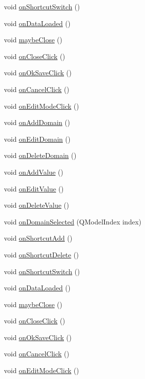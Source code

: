 \begin{DoxyCompactItemize}
\item 
void \hyperlink{class_domain_wnd_a923587b6e769548b01f6f301c70a75c5}{onShortcutSwitch} ()
\item 
void \hyperlink{class_domain_wnd_a97da398953d83b30ff9d510775f2429c}{onDataLoaded} ()
\item 
void \hyperlink{class_domain_wnd_a368d9485107021c0e17bde999533287a}{maybeClose} ()
\item 
void \hyperlink{class_domain_wnd_a87a607a1237bca2a8f6dbbe86cd02c99}{onCloseClick} ()
\item 
void \hyperlink{class_domain_wnd_a43db3327059f15b49495f0339c3e1a19}{onOkSaveClick} ()
\item 
void \hyperlink{class_domain_wnd_ab97def7e850e13d36679ef1f00dd78b0}{onCancelClick} ()
\item 
void \hyperlink{class_domain_wnd_a57deeaf7efeb50e45615cd6f3d1d9625}{onEditModeClick} ()
\item 
void \hyperlink{class_domain_wnd_a3aa016423aaec2a32099969faf1322cd}{onAddDomain} ()
\item 
void \hyperlink{class_domain_wnd_aafb419e408567c2725302f7c0f696a25}{onEditDomain} ()
\item 
void \hyperlink{class_domain_wnd_aa20577445a46b501095d8972a8999901}{onDeleteDomain} ()
\item 
void \hyperlink{class_domain_wnd_ac589d9fd81ef4ea8420850a975b81f6a}{onAddValue} ()
\item 
void \hyperlink{class_domain_wnd_aef95efd55420445d8b160d27e6967e42}{onEditValue} ()
\item 
void \hyperlink{class_domain_wnd_a315941c78082d8a44a670bcb55de972f}{onDeleteValue} ()
\item 
void \hyperlink{class_domain_wnd_a91c13e562f3f80ae1f8177a83d2e5f27}{onDomainSelected} (QModelIndex index)
\item 
void \hyperlink{class_domain_wnd_a4d8381ab52c1196d34565d58536f23f0}{onShortcutAdd} ()
\item 
void \hyperlink{class_domain_wnd_a9ca370e771d751c4c633b6a9fe800efb}{onShortcutDelete} ()
\item 
void \hyperlink{class_domain_wnd_a923587b6e769548b01f6f301c70a75c5}{onShortcutSwitch} ()
\item 
void \hyperlink{class_domain_wnd_a97da398953d83b30ff9d510775f2429c}{onDataLoaded} ()
\item 
void \hyperlink{class_domain_wnd_a368d9485107021c0e17bde999533287a}{maybeClose} ()
\item 
void \hyperlink{class_domain_wnd_a87a607a1237bca2a8f6dbbe86cd02c99}{onCloseClick} ()
\item 
void \hyperlink{class_domain_wnd_a43db3327059f15b49495f0339c3e1a19}{onOkSaveClick} ()
\item 
void \hyperlink{class_domain_wnd_ab97def7e850e13d36679ef1f00dd78b0}{onCancelClick} ()
\item 
void \hyperlink{class_domain_wnd_a57deeaf7efeb50e45615cd6f3d1d9625}{onEditModeClick} ()
\end{DoxyCompactItemize}
